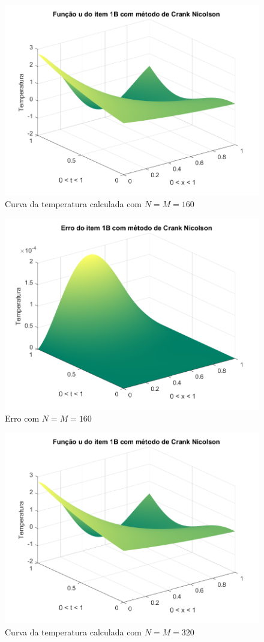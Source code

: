 \documentclass[12pt]{article}
\begin{document}
\begin{spacing}{1.5}
\begin{figure}
    \centering
    \includegraphics[width=0.8\linewidth]{Segunda_Tarefa/ItemC/nm160_calculada_B.png}
    \caption{Curva da temperatura calculada com $N=M=160$}
    \label{fig:CB_nm160_calculada}
\end{figure}

\begin{figure}
    \centering
    \includegraphics[width=0.8\linewidth]{Segunda_Tarefa/ItemC/nm160_erro_B.png}
    \caption{Erro com $N=M=160$}
    \label{fig:CB_nm160_erro}
\end{figure}

\begin{figure}
    \centering
    \includegraphics[width=0.8\linewidth]{Segunda_Tarefa/ItemC/nm320_calculada_B.png}
    \caption{Curva da temperatura calculada com $N=M=320$}
    \label{fig:CB_nm320_calculada}
\end{figure}


\end{spacing}
\end{document}
